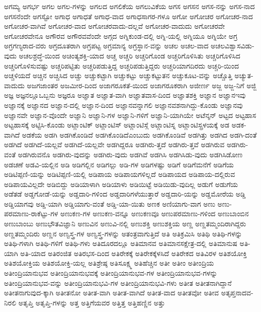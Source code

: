 {ಅಗಮ್ಯ
ಅಗರ್ಭ
ಅಗಲ
ಅಗಲ-ಗಳನ್ನು
ಅಗಲದ
ಅಗಲಿಕೆಯ
ಅಗಲುವಿಕೆಯ
ಅಗಸ
ಅಗಸನ
ಅಗಸ-ನನ್ನು
ಅಗಸ-ನಾದ
ಅಗಸನೆಂದೇ
ಅಗಸ್ಟೋ
ಅಗಾಧ
ಅಗಾಧತೆ
ಅಗಾಧ-ವಾದ
ಅಗಾಧಸಾಗರ-ಗಳೂ
ಅಗೋ
ಅಗೋಚರ
ಅಗೋಚರ-ನಾದ
ಅಗೋಚರ-ವಾಗಿವೆ
ಅಗೋಚರ-ವಾದ
ಅಗೋಚರವಾದು-ದಲ್ಲವೆ
ಅಗೋಚರ-ವಾದುದು
ಅಗೋಚರವೇ
ಅಗೋಚರವೇನೂ
ಅಗೌರವ
ಅಗೌರವವೆಂದೇ
ಅಗ್ಗದ
ಅಗ್ನಿಕುಂಡ-ದಲ್ಲಿ
ಅಗ್ನಿ-ಯಲ್ಲಿ
ಅಗ್ನಿಯೂ
ಅಗ್ನಿಯೇ
ಅಗ್ರ
ಅಗ್ರಗಣ್ಯರಾದ-ವರು
ಅಗ್ರದೂತರಾಗಿ
ಅಗ್ರಪಟ್ಟ
ಅಗ್ರಮಾನ್ಯ
ಅಗ್ರಸ್ಥಾನ-ವನ್ನು
ಅಚಲ
ಅಚಲ-ವಾದ
ಅಚಲವಿಶ್ವಾಸವಿಡು-ವುದು
ಅಚಲಶ್ರದ್ಧೆ-ಯಿಂದ
ಅಚಿಂತ್ಯಶಕ್ತಿ-ಯಾದ
ಅಚ್ಚ
ಅಚ್ಚರಿ
ಅಚ್ಚರಿಗೊಂಡ
ಅಚ್ಚರಿಗೊಳಿಸಿತು
ಅಚ್ಚರಿಗೊಳಿಸಿದ
ಅಚ್ಚರಿಗೊಳಿಸುವಷ್ಟು
ಅಚ್ಚರಿಪಟ್ಟಿತು
ಅಚ್ಚರಿಪಡುತ್ತಿದ್ದ
ಅಚ್ಚರಿಪಡುತ್ತಿದ್ದರು
ಅಚ್ಚರಿಯಾಗದಿರದು
ಅಚ್ಚರಿ-ಯಿಂದ
ಅಚ್ಚಳಿಯದೆ
ಅಚ್ಚಿನ
ಅಚ್ಚಿಸಿದ
ಅಚ್ಚು
ಅಚ್ಚುಕಟ್ಟಾಗಿ
ಅಚ್ಚುಕಟ್ಟು
ಅಚ್ಚುಕಟ್ಟುತನ
ಅಚ್ಚುಕೂಟ-ವನ್ನು
ಅಚ್ಚೊತ್ತಿ
ಅಚ್ಯುತ-ವಾದುದು
ಅಜಗಜಾಂತರ
ಅಜಮೀರ-ದಿಂದ
ಅಜಾಗರೂಕತೆ-ಯಿಂದ
ಅಜಾಗರೂಕರಾಗಿ
ಅಜೀರ್ಣ
ಅಜ್ಜ
ಅಜ್ಜ-ನಿಗೆ
ಅಜ್ಜಿ
ಅಜ್ಞ
ಅಜ್ಞನಲ್ಲೂಒಬ್ಬನು
ಅಜ್ಞರೂ
ಅಜ್ಞಾತ
ಅಜ್ಞಾತ-ವಾಗಿ
ಅಜ್ಞಾತವಾಸ-ದಿಂದ
ಅಜ್ಞಾತಶಕ್ತಿ
ಅಜ್ಞಾನ
ಅಜ್ಞಾನಇವು
ಅಜ್ಞಾನಕ್ಕೆ
ಅಜ್ಞಾನದ
ಅಜ್ಞಾನ-ದಲ್ಲಿ
ಅಜ್ಞಾನ-ದಿಂದ
ಅಜ್ಞಾನವನ್ನಾಗಲಿ
ಅಜ್ಞಾನವಶನಾಗಿದ್ದು-ಕೊಂಡು
ಅಜ್ಞಾನವು
ಅಜ್ಞಾನವೇ
ಅಜ್ಞಾನ-ವೊಂದೇ
ಅಜ್ಞಾನಿ
ಅಜ್ಞಾನಿ-ಗಳ
ಅಜ್ಞಾನಿ-ಗಳಿಗೆ
ಅಜ್ಞಾನಿ-ಯಾಗಿಯೇ
ಅಟೆನ್ಶನ್
ಅಟ್ಟದ
ಅಟ್ಟಹಾಸ
ಅಟ್ಟಹಾಸಕ್ಕೆ
ಅಟ್ಟಿಸಿ-ಕೊಂಡು
ಅಟ್ಲಾಂಟಿಕ್
ಅಟ್ಲಾಂಟಿಸ್
ಅಟ್ಲಾಂಟಿಸ್ಗೆ
ಅಟ್ಲಾಂಟಿಸ್ನ
ಅಟ್ಲಾಂಟಿಸ್ಪ್ರಳಯಕ್ಕೆ
ಅಡ
ಅಡಕ-ವಾಗಿದೆ
ಅಡಕೆಯ
ಅಡಗಿ
ಅಡಗಿಕೊಂಡಿದೆ
ಅಡಗಿಕೊಂಡಿದೆಎಂಬುದು
ಅಡಗಿಕೊಂಡಿವೆ
ಅಡಗಿತ್ತು
ಅಡಗಿದ
ಅಡಗಿ-ದಂತೆ
ಅಡಗಿದೆ
ಅಡಗಿದೆ-ಯಲ್ಲವೆ
ಅಡಗಿದೆ-ಯಲ್ಲವೇ
ಅಡಗಿದ್ದರೂ
ಅಡಗಿರು-ತ್ತದೆ
ಅಡಗಿರು-ತ್ತವೆ
ಅಡಗಿರುವ
ಅಡಗಿರು-ವಂತೆ
ಅಡಗಿರುವನೊ
ಅಡಗಿರು-ವುದನ್ನು
ಅಡಗಿರು-ವುದು
ಅಡಗಿವೆ
ಅಡಗಿಸಿ
ಅಡಗಿಸಿಡು-ವುದು
ಅಡಗಿಸಿಡೋಣ
ಅಡಚಣೆ
ಅಡವಿ-ಯಲ್ಲಿನ
ಅಡಿ
ಅಡಿಗಲ್ಲಿನ
ಅಡಿಗಲ್ಲು
ಅಡಿ-ಗಳ
ಅಡಿಗಳಷ್ಟು
ಅಡಿಗೆ
ಅಡಿಗೆಮನೆಗೆ
ಅಡಿಗೆಯ
ಅಡಿಟಿಪ್ಪಣಿ-ಯನ್ನು
ಅಡಿಟಿಪ್ಪಣಿ-ಯಲ್ಲಿ
ಅಡಿಪಾಯ
ಅಡಿಪಾಯಗಳಿಲ್ಲದೆ
ಅಡಿಪಾಯದ
ಅಡಿಪಾಯ-ದಲ್ಲಿರುವ
ಅಡಿಪಾಯವಿಲ್ಲದೇ
ಅಡಿಬಿದ್ದು
ಅಡಿಯಾಳಾಗಿ
ಅಡಿಯಾಳು
ಅಡಿಯಿಟ್ಟೆ
ಅಡಿಯಿಡು-ವುದಿಲ್ಲ
ಅಡುಗೆ
ಅಡುಗೆಯ
ಅಡೆತಡೆ
ಅಡ್ಡಗೋಡೆ-ಯನ್ನು
ಅಡ್ಡದಾರಿ-ಗಳಿಂದ
ಅಡ್ಡದಾರಿಗಳೆಯುತ್ತಾರೆ
ಅಡ್ಡದಾರಿ-ಯನ್ನು
ಅಡ್ಡಮೋರೆಯ
ಅಡ್ಡಿ
ಅಡ್ಡಿಯಾಗವು
ಅಡ್ಡಿ-ಯಾಗಿ
ಅಡ್ಡಿಯಾಗು-ವಂತೆ
ಅಡ್ಡಿ-ಯಾ-ಯಿತು
ಅಣಕ
ಅಣಿಯಾಗು-ವಾಗ
ಅಣು
ಅಣು-ಪರಮಾಣು-ರಾಕೆಟ್ಟು-ಗಳ
ಅಣುಕಣ-ಗಳ
ಅಣುಕಣ-ವನ್ನೂ
ಅಣುಕಣವೂ
ಅಣುಪರಮಾಣು-ಗಳಿಂದ
ಅಣುಬಾಂಬಿನ
ಅಣುಬಾಂಬು
ಅಣುಭೌತವಿಜ್ಞಾನಿ
ಅಣುವಿನ
ಅಣುವಿ-ನಲ್ಲಿ
ಅಣುಶಕ್ತಿ
ಅಣುಶಕ್ತಿಯ
ಅಣ್ಣ
ಅಣ್ಣತಮ್ಮಂದಿರಾಗಿದ್ದರು
ಅಣ್ಣತಮ್ಮಂದಿರು
ಅಣ್ಣನ
ಅಣ್ವಸ್ತ್ರ-ಗಳ
ಅಣ್ವಸ್ತ್ರ-ಗಳನ್ನು
ಅತಂತ್ರವಾಗುತ್ತಿದೆ
ಅತಿ
ಅತಿಕ್ರಮಿಸಿ
ಅತಿಥಿ
ಅತಿಥಿ-ಗಳನ್ನು
ಅತಿಥಿ-ಗಳಾಗಿ
ಅತಿಥಿ-ಗಳಿಗೆ
ಅತಿಥಿ-ಗಳು
ಅತಿದೂರದಲ್ಲೂ
ಅತಿಮಾನವ
ಅತಿಮಾನಸಕ್ಷೇತ್ರ-ದಲ್ಲಿ
ಅತಿಮಾನುಷ
ಅತಿ-ಯಾಗಿ
ಅತಿ-ಯಾದ
ಅತಿರಂಜಿತ
ಅತಿರಭಸ-ದಿಂದ
ಅತಿರೇಕಕ್ಕೆ
ಅತಿರೇಕಕ್ಕೆಳಸಿದೆ
ಅತಿರೇಕದ
ಅತಿವಿರಳ
ಅತಿಶಯೋಕ್ತಿ
ಅತಿಶಯೋಕ್ತಿಯ
ಅತಿಶಯೋಕ್ತಿ-ಯಲ್ಲ
ಅತಿಶ್ರೇಷ್ಠ
ಅತಿಸೂಕ್ಷ್ಮ
ಅತಿಹೆಚ್ಚಿನ
ಅತೀ
ಅತೀಂ
ಅತೀಂದ್ರಿಯ
ಅತೀಂದ್ರಿಯಾನುಭವ
ಅತೀಂದ್ರಿಯಾನುಭವಕ್ಕೆ
ಅತೀಂದ್ರಿಯಾನುಭವ-ಗಳ
ಅತೀಂದ್ರಿಯಾನುಭವ-ಗಳನ್ನು
ಅತೀಂದ್ರಿಯಾನುಭವ-ವನ್ನು
ಅತೀಂದ್ರಿಯಾನುಭವಿ-ಗಳ
ಅತೀಂದ್ರಿಯಾನುಭವಿ-ಗಳು
ಅತೀತ
ಅತೀತನಾಗಿದ್ದಾನೆ
ಅತೀತನಾಗುವುದ-ಕ್ಕಾಗಿ
ಅತೀತನೋ
ಅತೀತ-ವಾಗಿ
ಅತೀತ-ವಾಗಿದೆ
ಅತೀತ-ವಾದ
ಅತೀತವೋ
ಅತೀವ
ಅತೃಪ್ತನಾದವ-ನಿರಲಿ
ಅತೃಪ್ತಿ
ಅತೃಪ್ತಿ-ಗಳನ್ನು
ಅತ್ತ
ಅತ್ತಿಗೆಯವರ
ಅತ್ತಿತ್ತ
ಅತ್ತಿಹಣ್ಣಿನ
ಅತ್ತು
}
